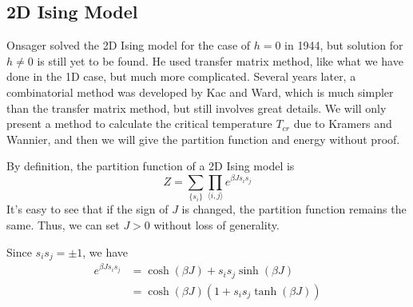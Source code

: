 \documentclass[11pt]{article}
\begin{document}
	\subsection{2D Ising Model}
	
	Onsager solved the 2D Ising model for the case of $h = 0$ in 1944\cite{onsager_solution},
	but solution for $h \neq 0$ is still yet to be found.
	He used transfer matrix method, like what we have done in the 1D case, but much more complicated.
	Several years later, a combinatorial method was developed by Kac and Ward\cite{KacWard1952}, 
	which is much simpler than the transfer matrix method, but still involves great details.
	We will only present a method to calculate the critical temperature $T_{cr}$ due to Kramers and Wannier\cite{KramersWannier1941},
	and then we will give the partition function and energy without proof.

	By definition, the partition function of a 2D Ising model is
	\begin{equation} \label{eq:PartitionFunction2D}
		Z = \sum_{\{s_i\}} \prod_{\langle i,j \rangle} e^{\beta J s_i s_j}
	\end{equation}
	It's easy to see that if the sign of $J$ is changed, the partition function remains the same.
	Thus, we can set $J > 0$ without loss of generality.

	Since $s_i s_j = \pm 1$, we have
	\begin{equation} \label{eq:PartitionFunction2DTransformingTrick}
		\begin{aligned}
			e^{\beta J s_i s_j} &= \cosh(\beta J) + s_i s_j \sinh(\beta J) \\
			&= \cosh(\beta J)(1 + s_i s_j \tanh(\beta J))
		\end{aligned}
	\end{equation}
\end{document}
